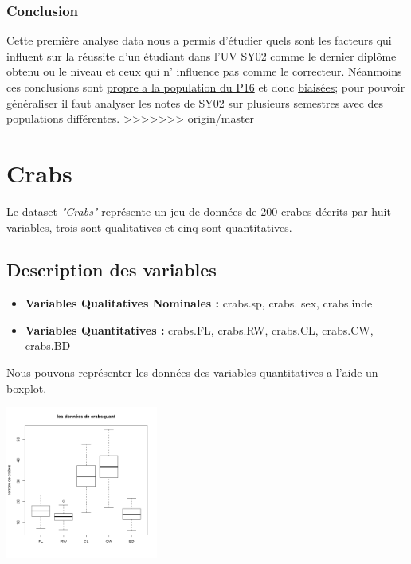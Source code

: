 \documentclass[10pt]{article}
\begin{document}
\subsubsection{Conclusion}
Cette première analyse data nous a permis d'étudier  quels sont les facteurs qui influent sur la réussite d'un étudiant dans l'UV SY02 comme le dernier diplôme obtenu ou le niveau et ceux qui n' influence pas comme le correcteur. Néanmoins ces conclusions sont \underline{propre a la population du P16} et donc  \underline{biaisées}; pour pouvoir généraliser il faut analyser les notes de SY02 sur plusieurs semestres avec des populations différentes.
>>>>>>> origin/master

\section{Crabs}
Le dataset \textit{"Crabs"} représente un jeu de données de 200 crabes décrits par huit variables, trois sont qualitatives et cinq sont quantitatives.

\subsection{Description des variables}


\begin{itemize}
	\item \textbf{Variables Qualitatives Nominales :}  crabs.sp, crabs. sex, crabs.inde
	\item \textbf{Variables Quantitatives : } crabs.FL, crabs.RW, crabs.CL, crabs.CW, crabs.BD
\end{itemize}

Nous pouvons représenter les données des variables quantitatives a l'aide un boxplot.
\begin{center}
	\includegraphics[width=50mm]{Figures/Crabs/bxp_crabsquant.png}
	\label{fig:boxplot_crabs_quantitatives}
\end{center}
\end{document}

